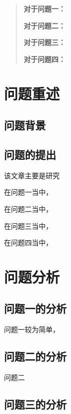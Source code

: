 \documentclass{cumcmthesis}
\title{}
\begin{document}
\maketitle
\begin{abstract}
	\par
	\textbf{对于问题一：}
	\par
	\textbf{对于问题二：}
	\par
	\textbf{对于问题三：}
	\par
	\textbf{对于问题四：}
	\par
\end{abstract}

\section{问题重述}
\subsection{问题背景}

\subsection{问题的提出}
该文章主要是研究
\par

\par
在问题一当中，
\par
在问题二当中，
\par
在问题三当中，
\par
在问题四当中，
\newpage
\section{问题分析}
\subsection{问题一的分析}
问题一较为简单，\par

\subsection{问题二的分析}
问题二
\subsection{问题三的分析}
\end{document}
